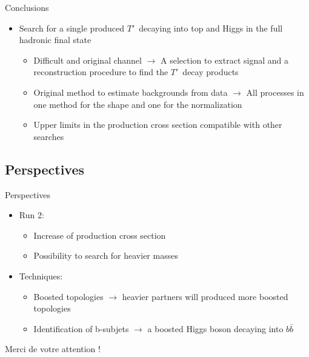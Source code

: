 \documentclass[usenames,dvipsnames]{beamer}
\newcommand{\bbbar}{$b\bar{b}$}
\newcommand{\Tp}{$T'$}
\begin{document}
\begin{frame}{Conclusions}
\begin{block}{}
\begin{itemize}
\begin{itemize}
\begin{itemize}
        \end{itemize}
    \end{itemize}
  \item Search for a single produced \Tp~decaying into top and Higgs in the full hadronic final state
    \begin{itemize}\tiny
    \item Difficult and original channel $\to$ A selection to extract signal and a reconstruction procedure to find the \Tp~decay products
    \item Original method to estimate backgrounds from data $\to$ All processes in one method for the shape and one for the normalization
    \item Upper limits in the production cross section compatible with other searches
    \end{itemize}
\end{itemize}
\end{block}
\end{frame}

\subsection{Perspectives}
\begin{frame}{Perspectives}

\begin{block}{}
\begin{itemize}\scriptsize
  \item Run 2:
    \begin{itemize}\scriptsize
    \item Increase of production cross section
    \item Possibility to search for heavier masses
    \end{itemize}
  \item Techniques:
    \begin{itemize}\scriptsize
    \item Boosted topologies $\to$ heavier partners will produced more boosted topologies
    \item Identification of b-subjets $\to$ a boosted Higgs boson decaying into \bbbar
    \end{itemize}

\end{itemize}
\end{block}

\end{frame}

\begin{frame}
\begin{center}
Merci de votre attention !
\end{center}
\end{frame}
\end{document}
